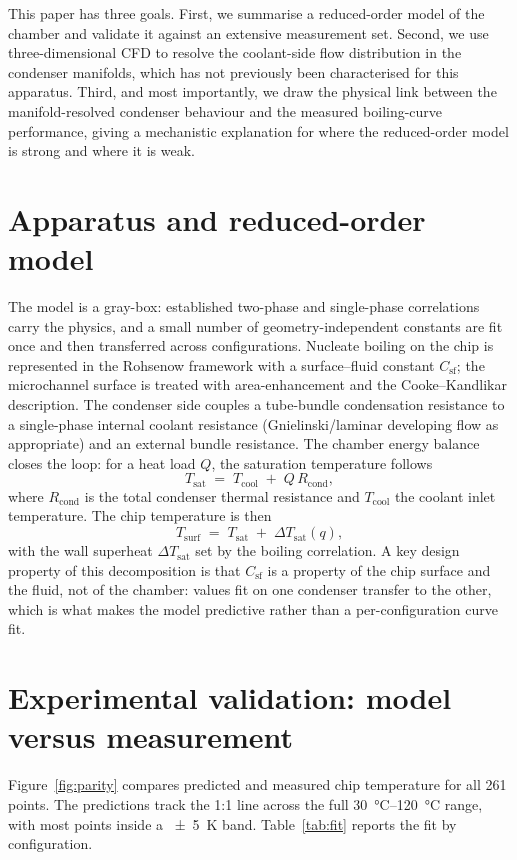 \documentclass[11pt]{article}
\newcommand{\Csf}{C_{\mathrm{sf}}}
\begin{document}
This paper has three goals. First, we summarise a reduced-order model of the chamber and
validate it against an extensive measurement set. Second, we use three-dimensional CFD to
resolve the coolant-side flow distribution in the condenser manifolds, which has not previously
been characterised for this apparatus. Third, and most importantly, we draw the physical link
between the manifold-resolved condenser behaviour and the measured boiling-curve performance,
giving a mechanistic explanation for where the reduced-order model is strong and where it is
weak.

\section{Apparatus and reduced-order model}
The model is a gray-box: established two-phase and single-phase correlations carry the physics,
and a small number of geometry-independent constants are fit once and then transferred across
configurations. Nucleate boiling on the chip is represented in the Rohsenow framework with a
surface--fluid constant $\Csf$; the microchannel surface is treated with area-enhancement and
the Cooke--Kandlikar description. The condenser side couples a tube-bundle condensation
resistance to a single-phase internal coolant resistance (Gnielinski/laminar developing flow
as appropriate) and an external bundle resistance. The chamber energy balance closes the loop:
for a heat load $Q$, the saturation temperature follows
\begin{equation}
T_{\mathrm{sat}} \;=\; T_{\mathrm{cool}} \;+\; Q\,R_{\mathrm{cond}},
\label{eq:tsat}
\end{equation}
where $R_{\mathrm{cond}}$ is the total condenser thermal resistance and $T_{\mathrm{cool}}$ the
coolant inlet temperature. The chip temperature is then
\begin{equation}
T_{\mathrm{surf}} \;=\; T_{\mathrm{sat}} \;+\; \Delta T_{\mathrm{sat}}(q),
\label{eq:tsurf}
\end{equation}
with the wall superheat $\Delta T_{\mathrm{sat}}$ set by the boiling correlation. A key design
property of this decomposition is that $\Csf$ is a property of the chip surface and the fluid,
not of the chamber: values fit on one condenser transfer to the other, which is what makes the
model predictive rather than a per-configuration curve fit.

\section{Experimental validation: model versus measurement}
Figure~\ref{fig:parity} compares predicted and measured chip temperature for all
\num{261} points. The predictions track the \num{1}:\num{1} line across the full
\SIrange{30}{120}{\degreeCelsius} range, with most points inside a \SI{\pm5}{\kelvin} band.
Table~\ref{tab:fit} reports the fit by configuration.
\end{document}
